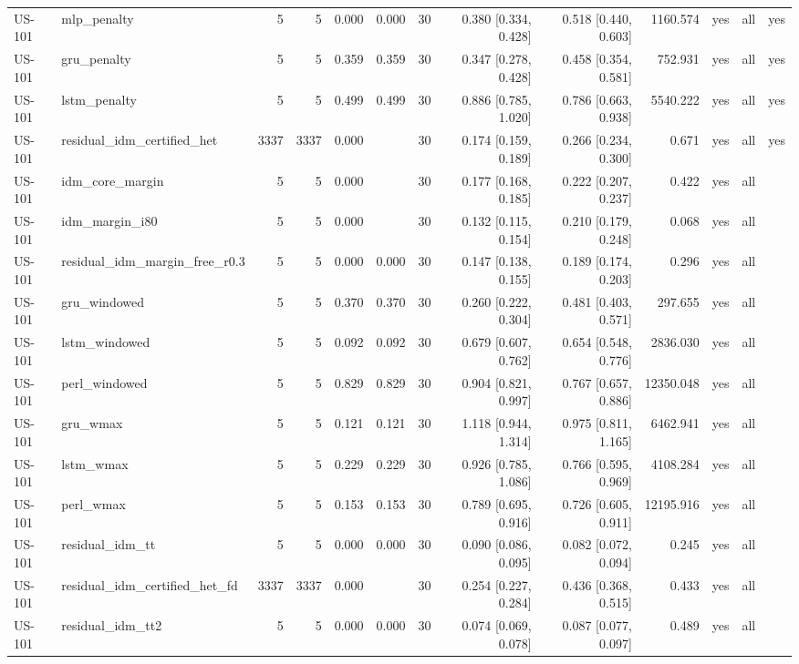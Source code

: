 \begin{table}[htbp]
{\begin{tabular}{llrrrrrrrrlll}
US-101 & mlp\_penalty & 5 & 5 & 0.000 & 0.000 & 30 & 0.380 [0.334, 0.428] & 0.518 [0.440, 0.603] & 1160.574 & yes & all & yes \\
US-101 & gru\_penalty & 5 & 5 & 0.359 & 0.359 & 30 & 0.347 [0.278, 0.428] & 0.458 [0.354, 0.581] & 752.931 & yes & all & yes \\
US-101 & lstm\_penalty & 5 & 5 & 0.499 & 0.499 & 30 & 0.886 [0.785, 1.020] & 0.786 [0.663, 0.938] & 5540.222 & yes & all & yes \\
US-101 & residual\_idm\_certified\_het & 3337 & 3337 & 0.000 &  & 30 & 0.174 [0.159, 0.189] & 0.266 [0.234, 0.300] & 0.671 & yes & all & yes \\
US-101 & idm\_core\_margin & 5 & 5 & 0.000 &  & 30 & 0.177 [0.168, 0.185] & 0.222 [0.207, 0.237] & 0.422 & yes & all &  \\
US-101 & idm\_margin\_i80 & 5 & 5 & 0.000 &  & 30 & 0.132 [0.115, 0.154] & 0.210 [0.179, 0.248] & 0.068 & yes & all &  \\
US-101 & residual\_idm\_margin\_free\_r0.3 & 5 & 5 & 0.000 & 0.000 & 30 & 0.147 [0.138, 0.155] & 0.189 [0.174, 0.203] & 0.296 & yes & all &  \\
US-101 & gru\_windowed & 5 & 5 & 0.370 & 0.370 & 30 & 0.260 [0.222, 0.304] & 0.481 [0.403, 0.571] & 297.655 & yes & all &  \\
US-101 & lstm\_windowed & 5 & 5 & 0.092 & 0.092 & 30 & 0.679 [0.607, 0.762] & 0.654 [0.548, 0.776] & 2836.030 & yes & all &  \\
US-101 & perl\_windowed & 5 & 5 & 0.829 & 0.829 & 30 & 0.904 [0.821, 0.997] & 0.767 [0.657, 0.886] & 12350.048 & yes & all &  \\
US-101 & gru\_wmax & 5 & 5 & 0.121 & 0.121 & 30 & 1.118 [0.944, 1.314] & 0.975 [0.811, 1.165] & 6462.941 & yes & all &  \\
US-101 & lstm\_wmax & 5 & 5 & 0.229 & 0.229 & 30 & 0.926 [0.785, 1.086] & 0.766 [0.595, 0.969] & 4108.284 & yes & all &  \\
US-101 & perl\_wmax & 5 & 5 & 0.153 & 0.153 & 30 & 0.789 [0.695, 0.916] & 0.726 [0.605, 0.911] & 12195.916 & yes & all &  \\
US-101 & residual\_idm\_tt & 5 & 5 & 0.000 & 0.000 & 30 & 0.090 [0.086, 0.095] & 0.082 [0.072, 0.094] & 0.245 & yes & all &  \\
US-101 & residual\_idm\_certified\_het\_fd & 3337 & 3337 & 0.000 &  & 30 & 0.254 [0.227, 0.284] & 0.436 [0.368, 0.515] & 0.433 & yes & all &  \\
US-101 & residual\_idm\_tt2 & 5 & 5 & 0.000 & 0.000 & 30 & 0.074 [0.069, 0.078] & 0.087 [0.077, 0.097] & 0.489 & yes & all &  \\
\bottomrule
\end{tabular}
}
\end{table}
